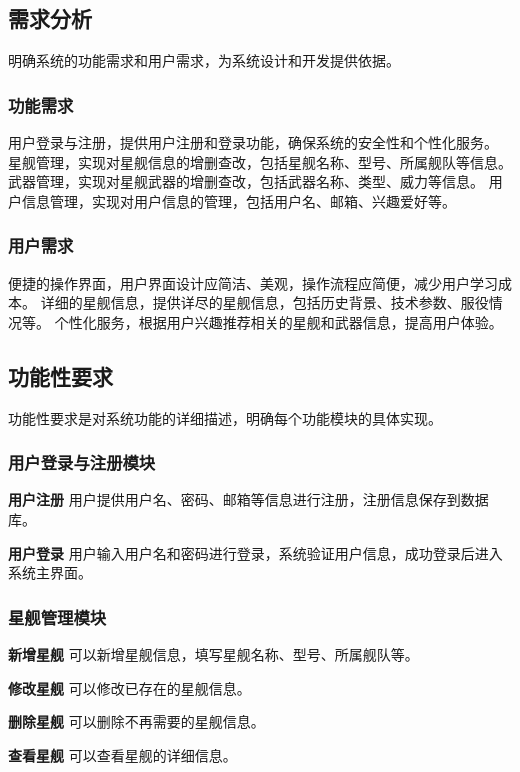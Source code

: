 \documentclass{base}
\begin{document}
\subsection{需求分析}

明确系统的功能需求和用户需求，为系统设计和开发提供依据。

\subsubsection{功能需求}
用户登录与注册，提供用户注册和登录功能，确保系统的安全性和个性化服务。
星舰管理，实现对星舰信息的增删查改，包括星舰名称、型号、所属舰队等信息。
武器管理，实现对星舰武器的增删查改，包括武器名称、类型、威力等信息。
用户信息管理，实现对用户信息的管理，包括用户名、邮箱、兴趣爱好等。
\subsubsection{用户需求}
便捷的操作界面，用户界面设计应简洁、美观，操作流程应简便，减少用户学习成本。
详细的星舰信息，提供详尽的星舰信息，包括历史背景、技术参数、服役情况等。
个性化服务，根据用户兴趣推荐相关的星舰和武器信息，提高用户体验。

\subsection{功能性要求}

功能性要求是对系统功能的详细描述，明确每个功能模块的具体实现。

\subsubsection{用户登录与注册模块}
\textbf{用户注册} 用户提供用户名、密码、邮箱等信息进行注册，注册信息保存到数据库。

\textbf{用户登录} 用户输入用户名和密码进行登录，系统验证用户信息，成功登录后进入系统主界面。

\subsubsection{星舰管理模块}

\textbf{新增星舰} 可以新增星舰信息，填写星舰名称、型号、所属舰队等。

\textbf{修改星舰} 可以修改已存在的星舰信息。

\textbf{删除星舰} 可以删除不再需要的星舰信息。

\textbf{查看星舰} 可以查看星舰的详细信息。
\end{document}
